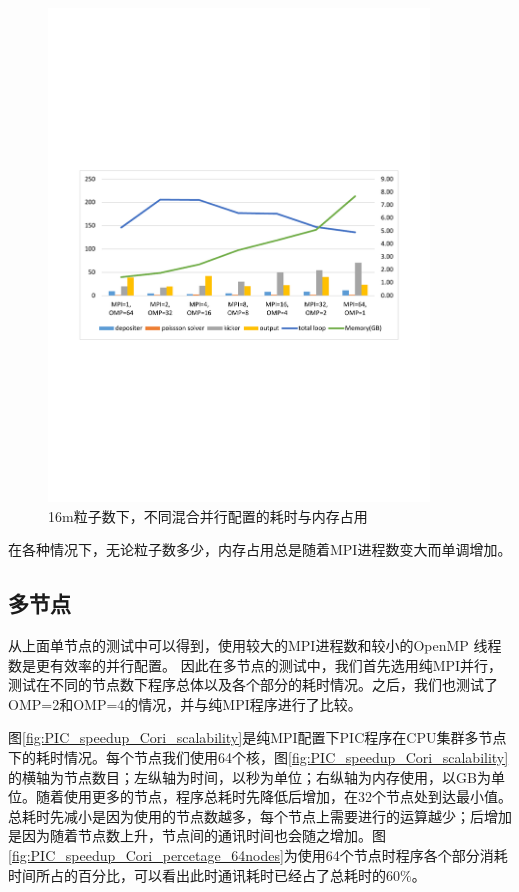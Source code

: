\begin{figure}[!htb]
  \centering
  \includegraphics[width=0.9\textwidth]{Img/PIC_speedup_Cori_1node_16m.pdf}
  \caption{16m粒子数下，不同混合并行配置的耗时与内存占用}
  \label{fig:PIC_speedup_Cori_1node_16m}
\end{figure}

在各种情况下，无论粒子数多少，内存占用总是随着MPI进程数变大而单调增加。
\subsection{多节点}
从上面单节点的测试中可以得到，使用较大的MPI进程数和较小的OpenMP 线程数是更有效率的并行配置。
因此在多节点的测试中，我们首先选用纯MPI并行，测试在不同的节点数下程序总体以及各个部分的耗时情况。之后，我们也测试了OMP=2和OMP=4的情况，并与纯MPI程序进行了比较。

图\ref{fig:PIC_speedup_Cori_scalability}是纯MPI配置下PIC程序在CPU集群多节点下的耗时情况。每个节点我们使用64个核，图\ref{fig:PIC_speedup_Cori_scalability}的横轴为节点数目；左纵轴为时间，以秒为单位；右纵轴为内存使用，以GB为单位。随着使用更多的节点，程序总耗时先降低后增加，在32个节点处到达最小值。总耗时先减小是因为使用的节点数越多，每个节点上需要进行的运算越少；后增加是因为随着节点数上升，节点间的通讯时间也会随之增加。图\ref{fig:PIC_speedup_Cori_percetage_64nodes}为使用64个节点时程序各个部分消耗时间所占的百分比，可以看出此时通讯耗时已经占了总耗时的60\%。

